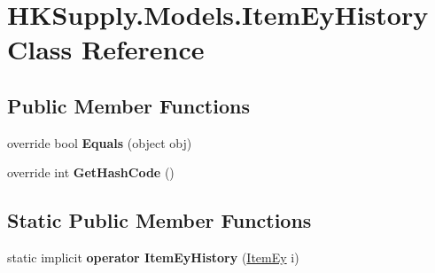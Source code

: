 \hypertarget{class_h_k_supply_1_1_models_1_1_item_ey_history}{}\section{H\+K\+Supply.\+Models.\+Item\+Ey\+History Class Reference}
\label{class_h_k_supply_1_1_models_1_1_item_ey_history}
\subsection*{Public Member Functions}
\begin{DoxyCompactItemize}
\item 
\mbox{\label{class_h_k_supply_1_1_models_1_1_item_ey_history_a686b036b910d2523db75b2d0c3b0db16}} 
override bool {\bfseries Equals} (object obj)
\item 
\mbox{\label{class_h_k_supply_1_1_models_1_1_item_ey_history_a57cd6a30bbe961c6b0c345a9baa3762f}} 
override int {\bfseries Get\+Hash\+Code} ()
\end{DoxyCompactItemize}
\subsection*{Static Public Member Functions}
\begin{DoxyCompactItemize}
\item 
\mbox{\label{class_h_k_supply_1_1_models_1_1_item_ey_history_a0cff379b15ecdfc38418dd43a1a82ad9}} 
static implicit {\bfseries operator Item\+Ey\+History} (\mbox{\hyperlink{class_h_k_supply_1_1_models_1_1_item_ey}{Item\+Ey}} i)
\end{DoxyCompactItemize}
